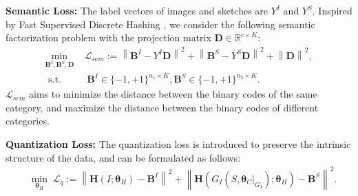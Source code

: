 \documentclass[runningheads]{llncs}
\newcommand{\st}{{\,\,\mathrm{s.t.\,\,}}}
\begin{document}
\noindent\textbf{Semantic Loss:} %
The label vectors of images and sketches are $Y^I$ and $Y^S$. Inspired by Fast Supervised Discrete Hashing \cite{GuiLSTT18}, we consider the following semantic factorization problem with the projection matrix $\mathbf{D} \in \mathbb{R}^{c\times K}$:
\begin{equation}\label{eq:equiv4}
\begin{split}
	\min_{\mathbf{B}^I, \mathbf{B}^S, \mathbf{D}}\; &\mathcal{L}_{sem} := \left \|  \mathbf{B}^I - Y^I\mathbf{D}\right \|^2 + \left \|  \mathbf{B}^S - Y^S\mathbf{D}\right \|^2 +  \left \|  \mathbf{D}\right \|^2,\\
	\st &\; \mathbf{B}^I  \in\{-1,+1\}^{n_1 \times K}, \mathbf{B}^S  \in\{-1,+1\}^{n_2 \times K}.
\end{split}
\end{equation}
$\mathcal{L}_{sem}$  aims to minimize the distance between the binary codes of the same category, and maximize the distance between the binary codes of different categories.

\noindent\textbf{Quantization Loss:} The quantization loss is introduced to preserve the intrinsic structure of the data, and can be formulated as follows:
\begin{equation}\label{eq:equiv5}
\begin{split}
&\min_{\bm{\theta}_H}\;\mathcal{L}_{q} :=  \left \|  \mathbf{H}\left ( I ;\bm{\theta}_H\right ) -\mathbf{B}^I\right \|^2 +\left \|  \mathbf{H}\left ( G_I\left ( S, \bm{\theta}_C|_{G_I} \right );\bm{\theta}_H  \right ) -\mathbf{B}^S\right \|^2. \\
\end{split}
\end{equation}
\end{document}
